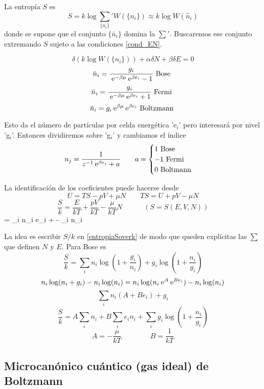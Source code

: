 \documentclass[10pt,oneside]{CBFT_book}
\begin{document}
La entropía $S$ es
\[
	S = k \log \sum_{ \{ n_i \} }' W ( \{ n_i \} ) \approx k \log W( \hat{n}_i )
\]
donde se supone que el conjunto $ \{ \bar{n}_i \}$ domina la $ \sum' $. Buscaremos ese conjunto
extremando $S$ sujeto a las condiciones \eqref{cond_EN}.

\[
	\delta ( k\log W( \{ n_i \} ) ) + \alpha \delta N + \beta \delta E = 0
\]
\[
	\bar{n}_i = \frac{ g_i }{ \:\mathrm{e}^{ -\beta \mu } \:\mathrm{e}^{ \beta e_i } - 1 } \text{ Bose }
\]
\[
	\bar{n}_i = \frac{ g_i }{ \:\mathrm{e}^{ -\beta \mu } \:\mathrm{e}^{ \beta e_i } + 1 } \text{ Fermi }
\]
\[
	\bar{n}_i =  g_i \:\mathrm{e}^{ \beta \mu } \:\mathrm{e}^{ \beta e_i } \text{ Boltzmann }
\]

Esto da el número de partículas por celda energética 'e$_i$' pero interesará por nivel 'g$_i$'.
Entonces dividiremos sobre 'g$_i$' y cambiamos el índice 
\[
	n_j = \frac{1}{z^{-1}\:\mathrm{e}^{\beta e_j} + a} \qquad 
	a = \begin{cases}
	 1 \text{ Bose } \\
	 -1 \text{ Fermi } \\
	 0 \text{ Boltmann }
	\end{cases}
\]

La identificación de los coeficientes puede hacerse desde 
\[
	U = TS - pV + \mu N \qquad TS = U  + pV - \mu N
\]
\[
	\frac{S}{k} = \frac{E}{kT} + \frac{pV}{kT} - \frac{\mu}{kT}N \qquad 
	\quad (S=S(E,V,N))
\]
\be
	 =  \sum_i n_i e_i +  -  \sum_i n_i
	\label{entropiaSoverk}
\ee

La idea es escribir $ S / k $ en \eqref{entropiaSoverk} de modo que queden explícitas las
$\sum$ que definen $N$ y $E$. Para Bose es 
\[
	\frac{S}{k} = \sum_i n_i \log \left( 1 + \frac{g_i}{n_i} \right) + 
	g_i \log \left( 1 + \frac{n_i}{g_i} \right)
\]
\[
	n_i \log ( n_i + g_i ) - n_i \log ( n_i ) = 
	n_i \log ( n_i \:\mathrm{e}^{A} \:\mathrm{e}^{Be_i} ) - n_i \log ( n_i )
\]
\[
	\sum_i n_i (A + Be_i) + g_i
\]
\[
	\frac{S}{k} = A \sum_i n_i + B \sum_i e_i n_i + \sum_i g_i \log \left( 1 + \frac{n_i}{g_i} \right)
\]
\[
	A = - \frac{ \mu }{ k T } \qquad \qquad B = \frac{1}{ kT }
\]

\subsection{Microcanónico cuántico (gas ideal) de Boltzmann}
\end{document}

